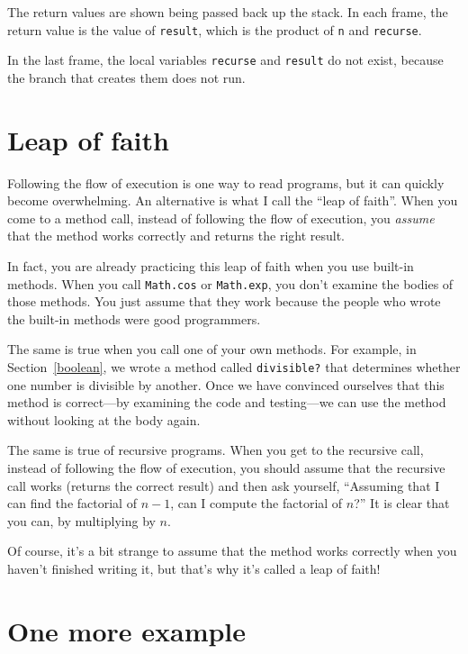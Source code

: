 \documentclass[10pt]{book}
\begin{document}
The return values are shown being passed back up the stack.  In each
frame, the return value is the value of {\tt result}, which is the
product of {\tt n} and {\tt recurse}.

In the last frame, the local
variables {\tt recurse} and {\tt result} do not exist, because
the branch that creates them does not run.


\section{Leap of faith}

Following the flow of execution is one way to read programs, but
it can quickly become overwhelming.  An
alternative is what I call the ``leap of faith''.  When you come to a
method call, instead of following the flow of execution, you {\em
assume} that the method works correctly and returns the right
result.

In fact, you are already practicing this leap of faith when you use
built-in methods.  When you call {\tt Math.cos} or {\tt Math.exp},
you don't examine the bodies of those methods.  You just
assume that they work because the people who wrote the built-in
methods were good programmers.

The same is true when you call one of your own methods.  For
example, in Section~\ref{boolean}, we wrote a method called 
\verb"divisible?" that determines whether one number is divisible by
another.  Once we have convinced ourselves that this method is
correct---by examining the code and testing---we can use the method
without looking at the body again.

The same is true of recursive programs.  When you get to the recursive
call, instead of following the flow of execution, you should assume
that the recursive call works (returns the correct result) and then ask
yourself, ``Assuming that I can find the factorial of $n-1$, can I
compute the factorial of $n$?''  It is clear that you
can, by multiplying by $n$.

Of course, it's a bit strange to assume that the method works
correctly when you haven't finished writing it, but that's why
it's called a leap of faith!


\section{One more example}
\label{one.more.example}
\end{document}
